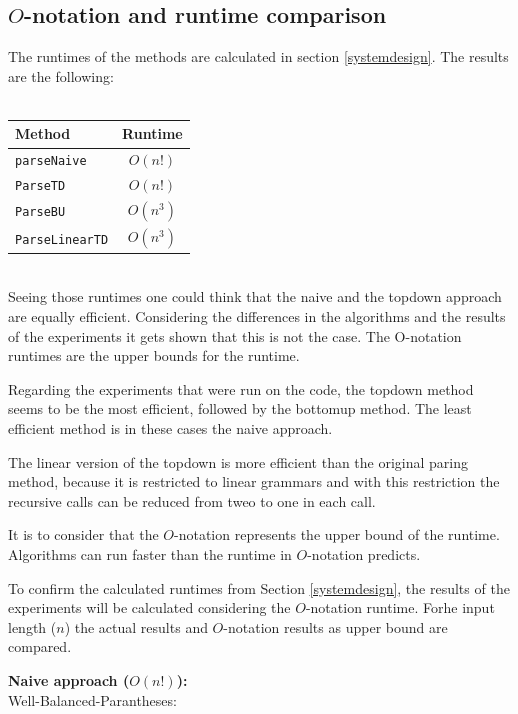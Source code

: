 \documentclass[a4paper, 11pt]{article}
\begin{document}



\subsection{$O$-notation and runtime comparison}
\label{runtime}


The runtimes of the methods are calculated in section \ref{systemdesign}. The results are the following:
\ \\ \\
\begin{tabular}{|l|c|}
\hline
Method & Runtime \\
\hline
\texttt{parseNaive} & $O(n!)$\\
\texttt{ParseTD} & $O(n!)$ \\
\texttt{ParseBU} & $O(n^3)$\\
\texttt{ParseLinearTD} & $O(n^3)$\\
\hline
\end{tabular}

\ \\
Seeing those runtimes one could think that the naive and the topdown approach are equally efficient. Considering the differences in the algorithms and the results of the experiments it gets shown that this is not the case. The O-notation runtimes are the upper bounds for the runtime. 

Regarding the experiments that were run on the code, the topdown method seems to be the most efficient, followed by the bottomup method. The least efficient method is in these cases the naive approach.

The linear version of the topdown is more efficient than the original paring method, because it is restricted to linear grammars and with this restriction the recursive calls can be reduced from tweo to one in each call.

It is to consider that the $O$-notation represents the upper bound of the runtime. Algorithms can run faster than the runtime in $O$-notation predicts.

To confirm the calculated runtimes from Section \ref{systemdesign}, the results of the experiments will be calculated considering the $O$-notation runtime. Forhe input length ($n$) the actual results and $O$-notation results as upper bound are compared.

\newpage
\textbf{Naive approach ($O(n!)$):} \\
Well-Balanced-Parantheses: 
\end{document}
